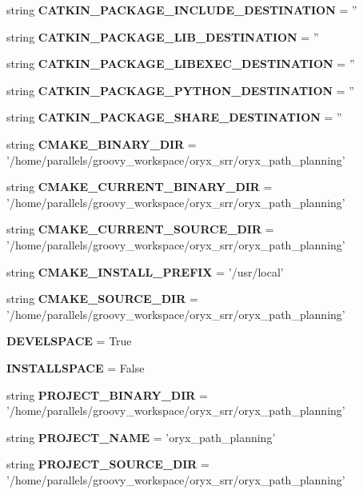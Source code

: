 \begin{DoxyCompactItemize}
string {\bf \-C\-A\-T\-K\-I\-N\-\_\-\-P\-A\-C\-K\-A\-G\-E\-\_\-\-I\-N\-C\-L\-U\-D\-E\-\_\-\-D\-E\-S\-T\-I\-N\-A\-T\-I\-O\-N} = ''
\item 
string {\bf \-C\-A\-T\-K\-I\-N\-\_\-\-P\-A\-C\-K\-A\-G\-E\-\_\-\-L\-I\-B\-\_\-\-D\-E\-S\-T\-I\-N\-A\-T\-I\-O\-N} = ''
\item 
string {\bf \-C\-A\-T\-K\-I\-N\-\_\-\-P\-A\-C\-K\-A\-G\-E\-\_\-\-L\-I\-B\-E\-X\-E\-C\-\_\-\-D\-E\-S\-T\-I\-N\-A\-T\-I\-O\-N} = ''
\item 
string {\bf \-C\-A\-T\-K\-I\-N\-\_\-\-P\-A\-C\-K\-A\-G\-E\-\_\-\-P\-Y\-T\-H\-O\-N\-\_\-\-D\-E\-S\-T\-I\-N\-A\-T\-I\-O\-N} = ''
\item 
string {\bf \-C\-A\-T\-K\-I\-N\-\_\-\-P\-A\-C\-K\-A\-G\-E\-\_\-\-S\-H\-A\-R\-E\-\_\-\-D\-E\-S\-T\-I\-N\-A\-T\-I\-O\-N} = ''
\item 
string {\bf \-C\-M\-A\-K\-E\-\_\-\-B\-I\-N\-A\-R\-Y\-\_\-\-D\-I\-R} = '/home/parallels/groovy\-\_\-workspace/oryx\-\_\-srr/oryx\-\_\-path\-\_\-planning'
\item 
string {\bf \-C\-M\-A\-K\-E\-\_\-\-C\-U\-R\-R\-E\-N\-T\-\_\-\-B\-I\-N\-A\-R\-Y\-\_\-\-D\-I\-R} = '/home/parallels/groovy\-\_\-workspace/oryx\-\_\-srr/oryx\-\_\-path\-\_\-planning'
\item 
string {\bf \-C\-M\-A\-K\-E\-\_\-\-C\-U\-R\-R\-E\-N\-T\-\_\-\-S\-O\-U\-R\-C\-E\-\_\-\-D\-I\-R} = '/home/parallels/groovy\-\_\-workspace/oryx\-\_\-srr/oryx\-\_\-path\-\_\-planning'
\item 
string {\bf \-C\-M\-A\-K\-E\-\_\-\-I\-N\-S\-T\-A\-L\-L\-\_\-\-P\-R\-E\-F\-I\-X} = '/usr/local'
\item 
string {\bf \-C\-M\-A\-K\-E\-\_\-\-S\-O\-U\-R\-C\-E\-\_\-\-D\-I\-R} = '/home/parallels/groovy\-\_\-workspace/oryx\-\_\-srr/oryx\-\_\-path\-\_\-planning'
\item 
{\bf \-D\-E\-V\-E\-L\-S\-P\-A\-C\-E} = \-True
\item 
{\bf \-I\-N\-S\-T\-A\-L\-L\-S\-P\-A\-C\-E} = \-False
\item 
string {\bf \-P\-R\-O\-J\-E\-C\-T\-\_\-\-B\-I\-N\-A\-R\-Y\-\_\-\-D\-I\-R} = '/home/parallels/groovy\-\_\-workspace/oryx\-\_\-srr/oryx\-\_\-path\-\_\-planning'
\item 
string {\bf \-P\-R\-O\-J\-E\-C\-T\-\_\-\-N\-A\-M\-E} = 'oryx\-\_\-path\-\_\-planning'
\item 
string {\bf \-P\-R\-O\-J\-E\-C\-T\-\_\-\-S\-O\-U\-R\-C\-E\-\_\-\-D\-I\-R} = '/home/parallels/groovy\-\_\-workspace/oryx\-\_\-srr/oryx\-\_\-path\-\_\-planning'
\end{DoxyCompactItemize}


